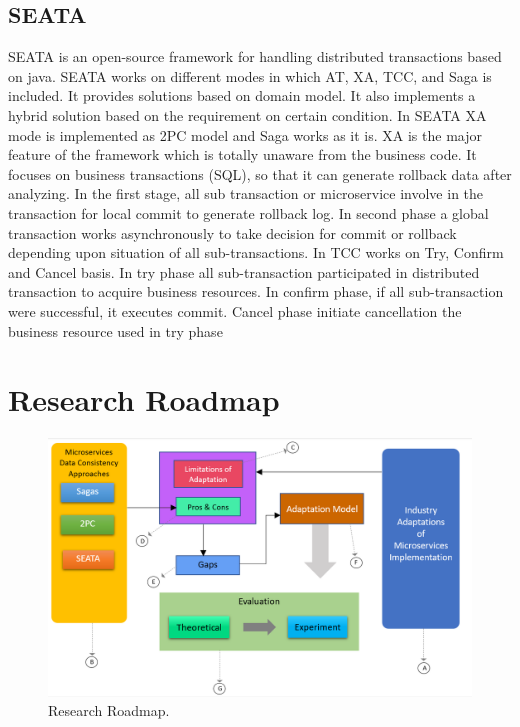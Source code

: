 \documentclass[a4paper,12pt]{article}
\begin{document}
\subsection{SEATA}
SEATA is an open-source framework for handling distributed transactions based on java. SEATA works on different modes in which AT, XA, TCC, and Saga is included. It provides solutions based on domain model. It also implements a hybrid solution based on the requirement on certain condition. In SEATA XA mode is implemented as 2PC model and Saga works as it is. XA is the major feature of the framework which is totally unaware from the business code. It focuses on business transactions (SQL), so that it can generate rollback data after analyzing. In the first stage, all sub transaction or microservice involve in the transaction for local commit to generate rollback log. In second phase a global transaction works asynchronously to take decision for commit or rollback depending upon situation of all sub-transactions. In TCC works on Try, Confirm and Cancel basis. In try phase all sub-transaction participated in distributed transaction to acquire business resources. In confirm phase, if all sub-transaction were successful, it executes commit. Cancel phase initiate cancellation the business resource used in try phase \cite{nineteen}


 


\newpage
 
\section{Research Roadmap}
\begin{figure}[h!]
    \begin{center}
	    \includegraphics[width=\columnwidth]{img/roadmap.png}
    \end{center}
	\caption{Research Roadmap.}
	\label{fig:microarch}
\end{figure}
\end{document}
